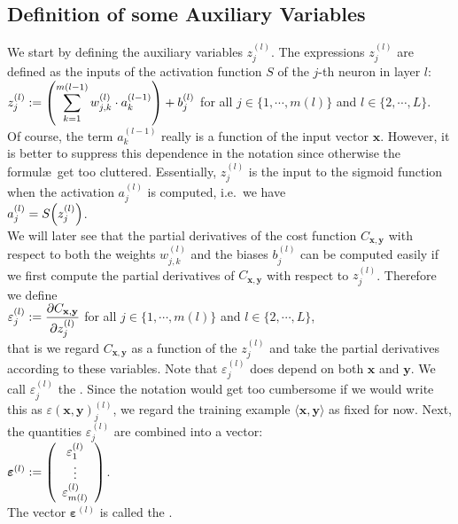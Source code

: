 \subsection{Definition of some Auxiliary Variables}
We start by defining the auxiliary variables $z_j^{(l)}$.
 The expressions $z_j^{(l)}$  are defined as the inputs of the activation function $S$ of the $j$-th neuron in
 layer $l$:
\\[0.2cm]
\hspace*{1.3cm}
$\displaystyle z_j^{(l)} := \left(\sum\limits_{k=1}^{m(l-1)}  w_{j,k}^{(l)} \cdot a_k^{(l-1)}\right) + b_j^{(l)}$
\quad for all  $j \in \{1, \cdots, m(l)\}$ and $l \in \{2,\cdots,L\}$.
\\[0.2cm]
Of course, the term  $a_k^{(l-1)}$ really is a function of the input vector $\mathbf{x}$.  However, it is better to suppress
this dependence in the notation since otherwise the formul\ae\ get too cluttered.
Essentially, $z_j^{(l)}$ is the input to the sigmoid function when the activation $a_j^{(l)}$ is computed,
i.e.~we have
\\[0.2cm]
\hspace*{1.3cm}
$a_j^{(l)} = S\Bigl(z_j^{(l)}\Bigr)$.
\\[0.2cm]
We will later see that the partial derivatives of the cost function $C_{\mathbf{x}, \mathbf{y}}$ with respect to both the weights
$w_{j,k}^{(l)}$ and the biases $b_j^{(l)}$ can be computed easily if we first compute the partial derivatives
of $C_{\mathbf{x}, \mathbf{y}}$ with respect to $z_j^{(l)}$.  Therefore we define
\\[0.2cm]
\hspace*{1.3cm}
$\displaystyle\varepsilon_j^{(l)} := \frac{\partial C_{\mathbf{x}, \mathbf{y}}}{\partial z_j^{(l)}}$ \quad for all $j \in \{1, \cdots, m(l)\}$ and $l \in \{2,\cdots, L\}$,
\\[0.2cm]
that is we regard $C_{\mathbf{x}, \mathbf{y}}$ as a function of the $z_j^{(l)}$ and take the partial
derivatives according to these variables.  
Note that $\varepsilon_j^{(l)}$ does depend on both $\mathbf{x}$ and $\mathbf{y}$.  
We call  $\varepsilon_j^{(l)}$ the . 
Since the notation would
get too cumbersome if we would write this as $\varepsilon(\mathbf{x}, \mathbf{y})_j^{(l)}$, we regard the training
example $\langle\mathbf{x}, \mathbf{y}\rangle$ as fixed for now.  Next, the quantities $\varepsilon_j^{(l)}$ are combined into a vector:
\\[0.2cm]
\hspace*{1.3cm}
$\boldsymbol{\varepsilon}^{(l)} := \left(
  \begin{array}[c]{c}
    \varepsilon_1^{(l)}      \\
    \vdots             \\
    \varepsilon_{m(l)}^{(l)}  
  \end{array}
  \right)
$.
\\[0.2cm]
The vector $\boldsymbol{\varepsilon}^{(l)}$ is called the .


